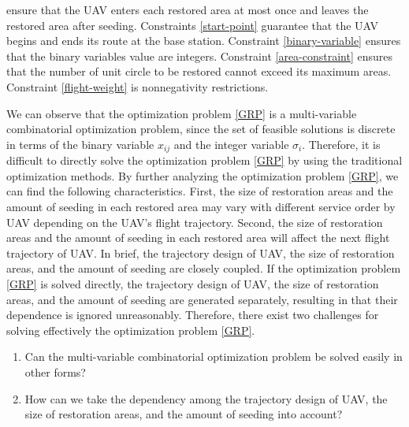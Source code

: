 \documentclass[preprint,5pt]{elsarticle}
\begin{document}
ensure that the UAV enters each restored area at most once and leaves the restored area after seeding.
Constraints \eqref{start-point}
guarantee that the UAV begins and ends its route at the base station. Constraint \eqref{binary-variable} ensures that the binary variables value are integers. Constraint \eqref{area-constraint}
ensures that the number of unit circle to be restored cannot exceed its maximum areas. Constraint \eqref{flight-weight} is  nonnegativity restrictions.

We can observe that the optimization problem \eqref{GRP} is a multi-variable combinatorial optimization problem, since the set of feasible solutions is discrete in terms of the binary variable $x_{ij}$ and the integer variable $\sigma_i$.
Therefore, it is difficult to directly solve the optimization problem \eqref{GRP} by using the traditional optimization methods. By further analyzing the optimization problem \eqref{GRP}, we can find the following characteristics. First, the size of restoration areas and the amount of seeding in each restored area may vary with different service order by UAV depending on the UAV's flight trajectory. Second, the size of restoration areas and the amount of seeding in each restored area will affect the next flight trajectory of UAV. In brief, the trajectory design of UAV, the size of restoration areas, and the amount of seeding are closely coupled. If the optimization problem \eqref{GRP} is solved directly, the trajectory design of UAV, the size of restoration areas, and the amount of seeding are generated separately, resulting in that their dependence is ignored unreasonably. Therefore, there exist two challenges for solving effectively the optimization problem \eqref{GRP}.
\begin{enumerate}
  \item Can the multi-variable combinatorial optimization problem be solved easily in other forms?
  \item How can we take the dependency among the trajectory design of UAV, the size of restoration areas, and the amount of seeding into account?
\end{enumerate}
\end{document}
